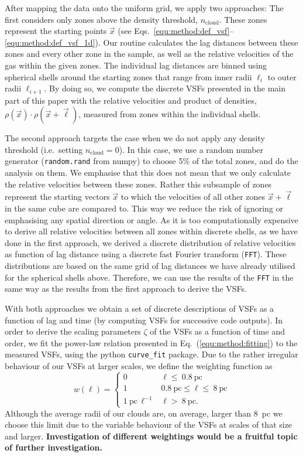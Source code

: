 After mapping the data onto the uniform grid, we apply two approaches: 
The first considers only zones above the density threshold, $n_\mathrm{cloud}$.
These zones represent the starting points $\vec{x}$ (see Eqs.~\ref{equ:method:def_vsf}--\ref{equ:method:def_vsf_1d}).
Our routine calculates the lag distances between these zones and every other zone in the sample, as well as the relative velocities of the gas within the given zones. 
The individual lag distances are binned using spherical shells around the starting zones that range from inner radii $\ell_{i}$ to outer radii $\ell_{i+1}$. 
By doing so, we compute the discrete VSFs presented in the main part of this paper with the relative velocities and product of densities, $\rho(\vec{x}) \cdot \rho(\vec{x}+\vec{\ell})$, measured from zones within the individual shells.

The second approach targets the case when we do not apply any density threshold (i.e.~setting $n_\mathrm{cloud} =0$).
In this case, we use a random number generator (\texttt{random.rand} from numpy) to choose 5\% of the total zones, and do the analysis on them.
We emphasise that this does not mean that we only calculate the relative velocities between these zones. Rather this subsample of zones represent the starting vectors $\vec{x}$ to which the velocities of all other zones $\vec{x} + \vec{\ell}$ in the same cube are compared to. This way we reduce the risk of ignoring or emphasising any spatial direction or angle.
As it is too computationally expensive to derive all relative velocities between all zones within discrete shells, as we have done in the first approach, we derived a discrete distribution of relative velocities as function of lag distance using a discrete fast Fourier transform (\texttt{FFT}). 
These distributions are based on the same grid of lag distances we have already utilised for the spherical shells above.
Therefore, we can use the results of the \texttt{FFT} in the same way as the results from the first approach to derive the VSFs.

With both approaches we obtain a set of discrete descriptions of VSFs as a function of  lag  and time (by computing VSFs for successive code outputs).
In order to derive the scaling parameters $\zeta$ of the VSFs as a function of time and order, we fit the power-law relation presented in Eq.~(\ref{equ:method:fitting}) to the measured VSFs, using the python \texttt{curve\_fit} package.
Due to the rather irregular behaviour of our VSFs at larger scales, we define the weighting function as
\begin{equation}
w\left(\ell\right) = \begin{cases}
    0 & \ell \leq~\mathrm{0.8~pc} \\
    1 & \mathrm{0.8~pc} \leq \ell \leq~\mathrm{8~pc} \\
    \mathrm{1~pc}\,\ell^{-1} & \ell >~\mathrm{8~pc}.
\end{cases}
\end{equation}
\noindent Although the average radii of our clouds are, on average, larger than 8~pc we choose this limit due to the variable behaviour of the VSFs at scales of that size and larger.
\textbf{
Investigation of different weightings would be a fruitful topic of further investigation.
}


